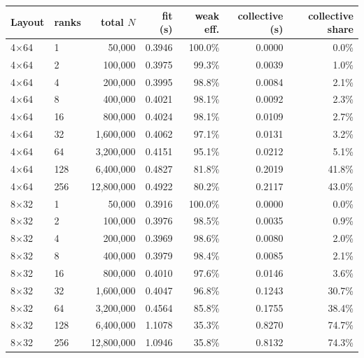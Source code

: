 \begin{tabular}{llrrrrr}
\toprule
Layout & ranks & total $N$ & fit (s) & weak eff. & collective (s) & collective share\\
\midrule
4$\times$64 & 1 & 50,000 & 0.3946 & 100.0\% & 0.0000 & 0.0\%\\
4$\times$64 & 2 & 100,000 & 0.3975 & 99.3\% & 0.0039 & 1.0\%\\
4$\times$64 & 4 & 200,000 & 0.3995 & 98.8\% & 0.0084 & 2.1\%\\
4$\times$64 & 8 & 400,000 & 0.4021 & 98.1\% & 0.0092 & 2.3\%\\
4$\times$64 & 16 & 800,000 & 0.4024 & 98.1\% & 0.0109 & 2.7\%\\
4$\times$64 & 32 & 1,600,000 & 0.4062 & 97.1\% & 0.0131 & 3.2\%\\
4$\times$64 & 64 & 3,200,000 & 0.4151 & 95.1\% & 0.0212 & 5.1\%\\
4$\times$64 & 128 & 6,400,000 & 0.4827 & 81.8\% & 0.2019 & 41.8\%\\
4$\times$64 & 256 & 12,800,000 & 0.4922 & 80.2\% & 0.2117 & 43.0\%\\
8$\times$32 & 1 & 50,000 & 0.3916 & 100.0\% & 0.0000 & 0.0\%\\
8$\times$32 & 2 & 100,000 & 0.3976 & 98.5\% & 0.0035 & 0.9\%\\
8$\times$32 & 4 & 200,000 & 0.3969 & 98.6\% & 0.0080 & 2.0\%\\
8$\times$32 & 8 & 400,000 & 0.3979 & 98.4\% & 0.0085 & 2.1\%\\
8$\times$32 & 16 & 800,000 & 0.4010 & 97.6\% & 0.0146 & 3.6\%\\
8$\times$32 & 32 & 1,600,000 & 0.4047 & 96.8\% & 0.1243 & 30.7\%\\
8$\times$32 & 64 & 3,200,000 & 0.4564 & 85.8\% & 0.1755 & 38.4\%\\
8$\times$32 & 128 & 6,400,000 & 1.1078 & 35.3\% & 0.8270 & 74.7\%\\
8$\times$32 & 256 & 12,800,000 & 1.0946 & 35.8\% & 0.8132 & 74.3\%\\
\bottomrule
\end{tabular}
